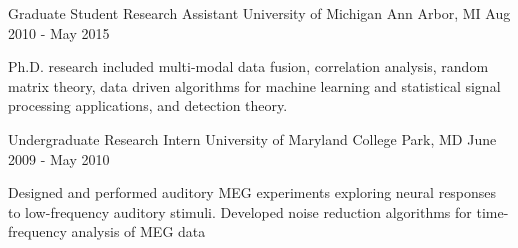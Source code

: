 

\begin{cventries}

  \cventry
    {Graduate Student Research Assistant} %
    {University of Michigan} %
    {Ann Arbor, MI} %
    {Aug 2010 - May 2015} %
    {
      \begin{cvitems} %
      \item {Ph.D. research included multi-modal data fusion, correlation analysis, random
          matrix theory, data driven algorithms for machine learning and statistical
          signal processing applications, and detection theory.}
      \end{cvitems}
    }

  \cventry
    {Undergraduate Research Intern} %
    {University of Maryland} %
    {College Park, MD} %
    {June 2009 - May 2010} %
    {
      \begin{cvitems} %
      \item {Designed and performed auditory MEG experiments exploring neural responses to
          low-frequency auditory stimuli. Developed noise reduction algorithms for
          time-frequency analysis of MEG data}
      \end{cvitems}
    }

\end{cventries}
